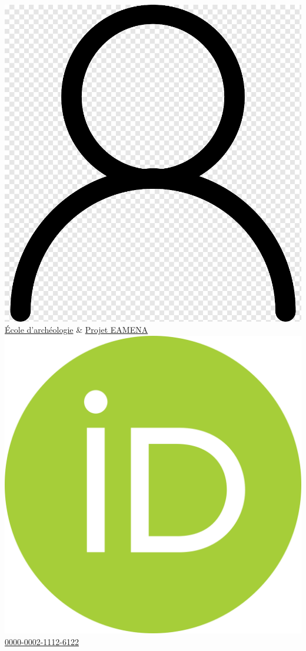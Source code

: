 \documentclass{article}
\begin{document}
\includegraphics[scale=0.01]{webpro} \quad \href{https://archit.web.ox.ac.uk/people/dr-thomas-huet}{École d'archéologie} \& \href{https://eamena.org/people/dr-thomas-huet}{Projet EAMENA}\\
\includegraphics[scale=0.007]{orcid} \quad \href{https://orcid.org/0000-0002-1112-6122}{0000-0002-1112-6122} \\
\end{document}
